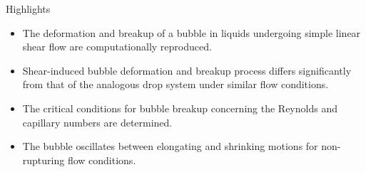 \documentclass{article}
\begin{document}
Highlights\\

\begin{itemize}
\item The deformation and breakup of a bubble in liquids undergoing simple linear shear flow are computationally reproduced.

\item Shear-induced bubble deformation and breakup process differs significantly from that of the analogous drop system under similar flow conditions.

\item The critical conditions for bubble breakup concerning the Reynolds and capillary numbers are determined.

\item The bubble oscillates between elongating and shrinking motions for non-rupturing flow conditions.

\end{itemize}
\end{document}
